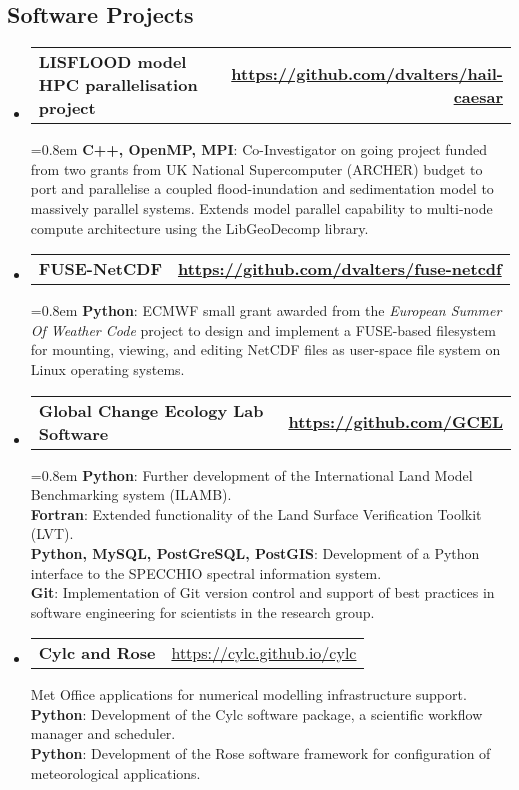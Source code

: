 \documentclass[10.5pt,a4]{article}
\makeatletter
\newcommand{\headerrow}[2]
{\begin{tabular*}{\linewidth}{l@{\extracolsep{\fill}}r}
	#1 &
	#2 \\
\end{tabular*}}
\makeatother
\begin{document}
\subsection*{Software Projects}
\begin{itemize}
	\parskip=0.1em

\item
\headerrow
		{\textbf{LISFLOOD model HPC parallelisation project}}
		{\textbf{\url{https://github.com/dvalters/hail-caesar}}}

		\parskip=0.8em
		\textbf{C++, OpenMP, MPI}: Co-Investigator on going project funded from two grants from UK National Supercomputer (ARCHER) budget to port and parallelise a coupled flood-inundation and sedimentation model to massively parallel systems. Extends model parallel capability to multi-node compute architecture using the LibGeoDecomp library. 

\item
\headerrow
		{\textbf{FUSE-NetCDF}}
		{\textbf{\url{https://github.com/dvalters/fuse-netcdf}}}

		\parskip=0.8em
		\textbf{Python}: ECMWF small grant awarded from the \textit{European Summer Of Weather Code} project to design and implement a FUSE-based filesystem for mounting, viewing, and editing NetCDF files as user-space file system on Linux operating systems.

	\item
	\headerrow
		{\textbf{Global Change Ecology Lab Software}}
		{\textbf{\url{https://github.com/GCEL}}}

		\parskip=0.8em
     \textbf{Python}: Further development of the International Land Model Benchmarking system (ILAMB).\\
		 \textbf{Fortran}: Extended functionality of the Land Surface Verification Toolkit (LVT). \\
		 \textbf{Python, MySQL, PostGreSQL, PostGIS}: Development of a Python interface to the SPECCHIO spectral information system. \\
		 \textbf{Git}: Implementation of Git version control and support of best practices in software engineering for scientists in the research group.

	\item
	\headerrow
		{\textbf{Cylc and Rose}}
		{\url{https://cylc.github.io/cylc}}

		Met Office applications for numerical modelling infrastructure support. \\
		\textbf{Python}: Development of the Cylc software package, a scientific workflow manager and scheduler. \\ 
		\textbf{Python}: Development of the Rose software framework for configuration of meteorological applications. 


\end{itemize}
\end{document}

